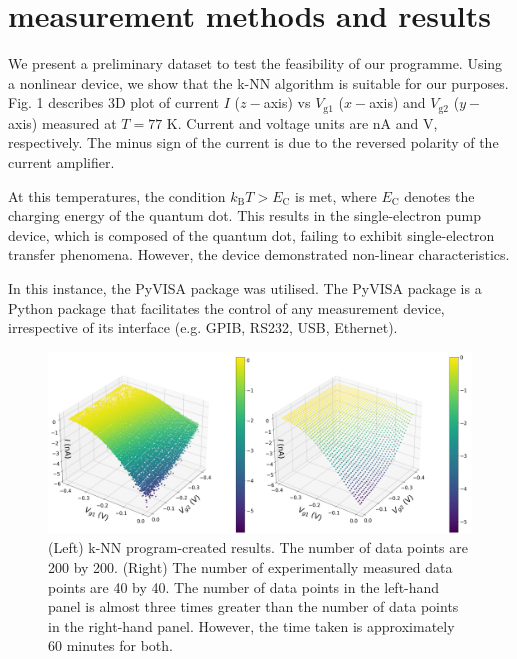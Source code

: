 \documentclass[jkps,preprint,fleqn,showpacs,showkeys]{revtex4}
\begin{document}
\section{measurement methods and results}
We present a preliminary dataset to test the feasibility of our programme.
Using a nonlinear device, we show that the k-NN algorithm is suitable for our purposes.
Fig. 1 describes 3D plot of current $I$ ($z-$axis) vs $V_\text{g1}$ ($x-$axis) and $V_\text{g2}$ ($y-$axis) measured at $T=77$ K. Current and voltage units are nA and V, respectively. 
The minus sign of the current is due to the reversed polarity of the current amplifier. 

At this temperatures, the condition $k_\text{B}T > E_\text{C} $ is met, where $E_\text{C} $ denotes the charging energy of the quantum dot. This results in the single-electron pump device, which is composed of the quantum dot, failing to exhibit single-electron transfer phenomena. However, the device demonstrated non-linear characteristics.

In this instance, the PyVISA package was utilised. The PyVISA package is a Python package that facilitates the control of any measurement device, irrespective of its interface (e.g. GPIB, RS232, USB, Ethernet).\cite{pyvisa}

\renewcommand{\figurename}{Fig. }
\begin{figure}[h]
\centering
\includegraphics[width=12cm]{Fig_I_Vg}
\parbox{13cm}{\vspace*{0.5cm}
\caption{(Left) k-NN program-created results. The number of data points are 200 by
200. (Right) The number of experimentally measured data points are 40 by 40. 
The number of data points in the left-hand panel is almost three times greater than the number of data points in the right-hand panel. However, the time taken is approximately 60 minutes for both.}
\label{plot1}}
\end{figure}
\end{document}
